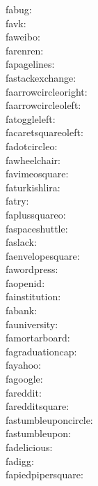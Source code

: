 fabug: {\FA \fabug} \\
favk: {\FA \favk} \\
faweibo: {\FA \faweibo} \\
farenren: {\FA \farenren} \\
fapagelines: {\FA \fapagelines} \\
fastackexchange: {\FA \fastackexchange} \\
faarrowcircleoright: {\FA \faarrowcircleoright} \\
faarrowcircleoleft: {\FA \faarrowcircleoleft} \\
fatoggleleft: {\FA \fatoggleleft} \\
facaretsquareoleft: {\FA \facaretsquareoleft} \\
fadotcircleo: {\FA \fadotcircleo} \\
fawheelchair: {\FA \fawheelchair} \\
favimeosquare: {\FA \favimeosquare} \\
faturkishlira: {\FA \faturkishlira} \\
fatry: {\FA \fatry} \\
faplussquareo: {\FA \faplussquareo} \\
faspaceshuttle: {\FA \faspaceshuttle} \\
faslack: {\FA \faslack} \\
faenvelopesquare: {\FA \faenvelopesquare} \\
fawordpress: {\FA \fawordpress} \\
faopenid: {\FA \faopenid} \\
fainstitution: {\FA \fainstitution} \\
fabank: {\FA \fabank} \\
fauniversity: {\FA \fauniversity} \\
famortarboard: {\FA \famortarboard} \\
fagraduationcap: {\FA \fagraduationcap} \\
fayahoo: {\FA \fayahoo} \\
fagoogle: {\FA \fagoogle} \\
fareddit: {\FA \fareddit} \\
faredditsquare: {\FA \faredditsquare} \\
fastumbleuponcircle: {\FA \fastumbleuponcircle} \\
fastumbleupon: {\FA \fastumbleupon} \\
fadelicious: {\FA \fadelicious} \\
fadigg: {\FA \fadigg} \\
fapiedpipersquare: {\FA \fapiedpipersquare} \\
